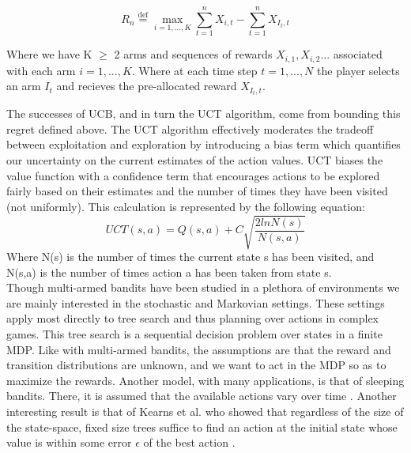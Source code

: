 \documentclass[msc, deptreport, ai, romanprepages]{infthesis}
\newcommand*{\defeq}{\stackrel{\text{def}}{=}}
\begin{document}
\begin{equation}
R_n \defeq \max_{i=1,...,K} \sum_{t=1}^n X_{i,t} - \sum_{t=1}^n X_{I_t,t}
\end{equation}

Where we have K \(\geq\) 2 arms and sequences of rewards \(X_{i,1},X_{i,2}...\) associated with each arm \( i = 1,...,K\). Where at each time step \( t=1,...,N\) the player selects an arm \(I_t\) and recieves the pre-allocated reward \(X_{I_t,t}\).

The successes of UCB, and in turn the UCT algorithm, come from bounding this regret defined above. The UCT algorithm effectively moderates the tradeoff between exploitation and exploration by introducing a bias term which quantifies our uncertainty on the current estimates of the action values. UCT biases the value function with a confidence term that encourages actions to be explored fairly based on their estimates and the number of times they have been visited (not uniformly). This calculation is represented by the following equation:
\begin{equation}
UCT(s,a) = Q(s,a) + C \sqrt{\frac{2lnN(s)}{N(s,a)}}
\end{equation}
Where N(s) is the number of times the current state s has been visited, and N(s,a) is the number of times action a has been taken from state s. \\
Though multi-armed bandits have been studied in a plethora of environments we are mainly interested in the stochastic and Markovian settings. These settings apply most directly to tree search and thus planning over actions in complex games. This tree search is a sequential decision problem over states in a finite MDP. Like with multi-armed bandits, the assumptions are that the reward and transition distributions are unknown, and we want to act in the MDP so as to maximize the rewards. Another model, with many applications, is that of sleeping bandits. There, it is assumed that the available actions vary over time \cite{regretAnalysis}. Another interesting result is that of Kearns et al. who showed that regardless of the size of the state-space, fixed size trees suffice to find an action at the initial state whose value is within some error \(\epsilon\) of the best action \cite{Kearns2002}.
\end{document}
